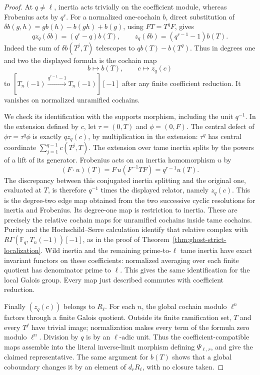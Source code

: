 \begin{proof}
At \(q\ne\ell\), inertia acts trivially on the coefficient
module, whereas Frobenius acts by \(q^r\). For a normalized
one-cochain \(b\), direct substitution of
\(\delta b(g,h)=g b(h)-b(gh)+b(g)\), using \(FT=T^qF\),
gives
\[
 qz_q(\delta b)=(q^r-q)b(T),\qquad
       z_q(\delta b)=(q^{r-1}-1)b(T).
\]
Indeed the sum of \(\delta b(T^j,T)\) telescopes to
\(qb(T)-b(T^q)\). Thus in degrees one and two the
displayed formula is the cochain map
\[
 b\longmapsto b(T),\qquad c\longmapsto z_q(c)
\]
to \([T_n(-1)\xrightarrow{q^{r-1}-1}T_n(-1)][-1]\)
after any finite coefficient reduction. It vanishes on
normalized unramified cochains.

We check its identification with the supports morphism,
including the unit \(q^{-1}\). In the extension defined
by \(c\), let \(\tau=(0,T)\) and \(\phi=(0,F)\).
The central defect of \(\phi\tau=\tau^q\phi\) is
exactly \(qz_q(c)\), by multiplication in the extension:
\(\tau^q\) has central coordinate
\(\sum_{j=1}^{q-1}c(T^j,T)\). The extension over tame
inertia splits by the powers of a lift of its generator.
Frobenius acts on an inertia homomorphism \(u\) by
\[
       (F\cdot u)(T)=F\,u(F^{-1}TF)=q^{r-1}u(T).
\]
The discrepancy between this conjugated inertia splitting
and the original one, evaluated at \(T\), is therefore
\(q^{-1}\) times the displayed relator, namely \(z_q(c)\).
This is the degree-two edge map obtained from the two
successive cyclic resolutions for inertia and Frobenius.
Its degree-one map is restriction to inertia. These are
precisely the relative cochain maps for unramified
cochains inside tame cochains. Purity and the
Hochschild--Serre calculation identify that relative
complex with \(R\Gamma(\mathbb F_q,T_n(-1))[-1]\),
as in the proof of Theorem~\ref{thm:ghost-strict-localization}.
Wild inertia and the remaining prime-to-\(\ell\) tame
inertia have exact invariant functors on these coefficients:
normalized averaging over each finite quotient has
denominator prime to \(\ell\). This gives the same
identification for the local Galois group. Every map just
described commutes with coefficient reduction.

Finally \((z_q(c))\) belongs to \(R_\ell\). For each
\(n\), the global cochain modulo \(\ell^n\) factors
through a finite Galois quotient. Outside its finite
ramification set, \(T\) and every \(T^j\) have trivial
image; normalization makes every term of the formula
zero modulo \(\ell^n\). Division by \(q\) is by an
\(\ell\)-adic unit. Thus the coefficient-compatible
maps assemble into the literal inverse-limit morphism
defining \(\Psi_{\ell,r}\), and give the claimed
representative. The same argument for \(b(T)\) shows
that a global coboundary changes it by an element of
\(d_rR_\ell\), with no closure taken.
\end{proof}

